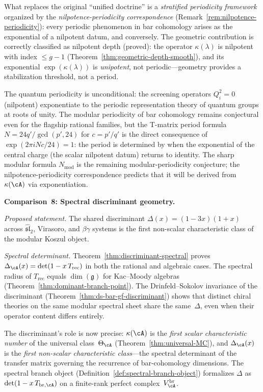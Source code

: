 What replaces the original ``unified doctrine'' is a
\emph{stratified periodicity framework} organized by the
\emph{nilpotence-periodicity correspondence}
(Remark~\ref{rem:nilpotence-periodicity}): every periodic phenomenon
in bar cohomology arises as the exponential of a nilpotent datum, and
conversely.  The geometric contribution is correctly classified as
nilpotent depth (proved): the operator $\kappa(\lambda)$ is nilpotent
with index $\leq g-1$ (Theorem~\ref{thm:geometric-depth-smooth}),
and its exponential $\exp(\kappa(\lambda))$ is \emph{unipotent}, not
periodic---geometry provides a stabilization threshold, not a period.

The quantum periodicity is unconditional: the screening operators
$Q_i^2 = 0$ (nilpotent) exponentiate to the periodic representation
theory of quantum groups at roots of unity.  The modular periodicity
of bar cohomology remains conjectural even for the flagship rational
families, but the T-matrix period formula
$N = 24q'/\gcd(p',24)$ for $c = p'/q'$ is the direct consequence of
$\exp(2\pi i N c/24) = 1$: the period is determined by when the
exponential of the central charge (the scalar nilpotent datum) returns
to identity.  The sharp modular formula $N_{\mathrm{mod}}$ is the
remaining modular-periodicity conjecture; the
nilpotence-periodicity correspondence predicts that it will be
derived from~$\kappa(\cA)$ via exponentiation.

\medskip

\noindent\textbf{Comparison~8: Spectral discriminant geometry.}

\emph{Proposed statement.}
The shared discriminant $\Delta(x) = (1-3x)(1+x)$ across
$\widehat{\mathfrak{sl}}_2$, Virasoro, and $\beta\gamma$ systems
is the first non-scalar characteristic class of the modular
Koszul object.

\emph{Spectral determinant.}
Theorem~\ref{thm:discriminant-spectral} proves
$\Delta_{\cA}(x) = \det(1 - x\, T_{\mathrm{rec}})$ in both the
rational and algebraic cases.  The spectral radius of
$T_{\mathrm{rec}}$ equals $\dim(\mathfrak{g})$ for Kac--Moody
algebras (Theorem~\ref{thm:dominant-branch-point}).  The
Drinfeld--Sokolov invariance of the discriminant
(Theorem~\ref{thm:ds-bar-gf-discriminant}) shows that distinct
chiral theories on the same modular spectral sheet share the
same~$\Delta$, even when their operator content differs entirely.

The discriminant's role is now precise: $\kappa(\cA)$ is the
\emph{first scalar characteristic number} of the universal
class~$\Theta_{\cA}$ (Theorem~\ref{thm:universal-MC}), and $\Delta_{\cA}(x)$ is the \emph{first
non-scalar characteristic class}---the spectral determinant of
the transfer matrix governing the recurrence of bar-cohomology
dimensions.  The spectral branch object
(Definition~\ref{def:spectral-branch-object}) formalizes $\Delta$
as $\det(1 - x\, T_{\mathrm{br},\cA})$ on a finite-rank perfect
complex~$V_{\cA}^{\mathrm{br}}$.

